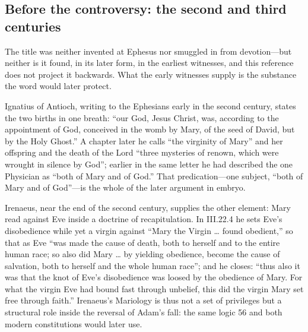 \subsection*{Before the controversy: the second and third centuries}

The title was neither invented at Ephesus nor smuggled in from
devotion---but neither is it found, in its later form, in the earliest
witnesses, and this reference does not project it backwards. What the
early witnesses supply is the substance the word would later protect.

Ignatius of Antioch, writing to the Ephesians early in the second
century, states the two births in one breath: ``our God, Jesus Christ,
was, according to the appointment of God, conceived in the womb by Mary,
of the seed of David, but by the Holy Ghost.'' A chapter later he calls
``the virginity of Mary'' and her offspring and the death of the Lord
``three mysteries of renown, which were wrought in silence by God'';
earlier in the same letter he had described the one Physician as ``both
of Mary and of God.''
That predication---one subject, ``both of Mary and of God''---is the
whole of the later argument in embryo.

Irenaeus, near the end of the second century, supplies the other
element: Mary read against Eve inside a doctrine of recapitulation. In
 III.22.4 he sets Eve's disobedience while yet a
virgin against ``Mary the Virgin \ldots{} found obedient,'' so that as
Eve ``was made the cause of death, both to herself and to the entire
human race; so also did Mary \ldots{} by yielding obedience, become the
cause of salvation, both to herself and the whole human race''; and he
closes: ``thus also it was that the knot of Eve's disobedience was loosed
by the obedience of Mary. For what the virgin Eve had bound fast through
unbelief, this did the virgin Mary set free through
faith.''
Irenaeus's Mariology is thus not a set of privileges but a structural
role inside the reversal of Adam's fall: the same logic  56 and both modern constitutions would later use.

